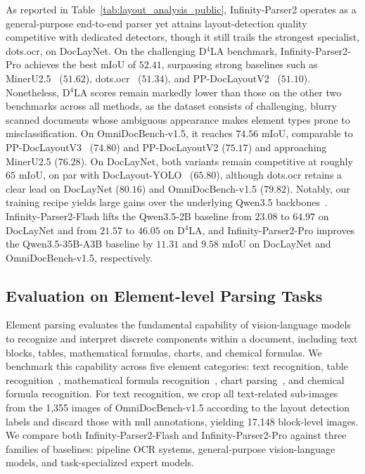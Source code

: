 As reported in Table~\ref{tab:layout_analysis_public}, Infinity-Parser2 operates as a general-purpose end-to-end parser yet attains layout-detection quality competitive with dedicated detectors, though it still trails the strongest specialist, dots.ocr, on DocLayNet. On the challenging D$^4$LA benchmark, Infinity-Parser2-Pro achieves the best mIoU of $52.41$, surpassing strong baselines such as MinerU2.5~\cite{niu2025mineru2} ($51.62$), dots.ocr~\cite{dotsocr2025} ($51.34$), and PP-DocLayoutV2~\cite{paddle2025ppdoclayoutv2} ($51.10$). Nonetheless, D$^4$LA scores remain markedly lower than those on the other two benchmarks across all methods, as the dataset consists of challenging, blurry scanned documents whose ambiguous appearance makes element types prone to misclassification. On OmniDocBench-v1.5, it reaches $74.56$ mIoU, comparable to PP-DocLayoutV3~\cite{paddle2026ppdoclayoutv3} ($74.80$) and PP-DocLayoutV2 ($75.17$) and approaching MinerU2.5 ($76.28$). On DocLayNet, both variants remain competitive at roughly $65$ mIoU, on par with DocLayout-YOLO~\cite{zhao2024doclayoutyolo} ($65.80$), although dots.ocr retains a clear lead on DocLayNet ($80.16$) and OmniDocBench-v1.5 ($79.82$). Notably, our training recipe yields large gains over the underlying Qwen3.5 backbones~\cite{qwen3.5}. Infinity-Parser2-Flash lifts the Qwen3.5-2B baseline from $23.08$ to $64.97$ on DocLayNet and from $21.57$ to $46.05$ on D$^4$LA, and Infinity-Parser2-Pro improves the Qwen3.5-35B-A3B baseline by $11.31$ and $9.58$ mIoU on DocLayNet and OmniDocBench-v1.5, respectively.

\subsection{Evaluation on Element-level Parsing Tasks}

Element parsing evaluates the fundamental capability of vision-language models to recognize and interpret discrete components within a document, including text blocks, tables, mathematical formulas, charts, and chemical formulas. We benchmark this capability across five element categories: text recognition, table recognition~\cite{zhong2020image, zheng2021global}, mathematical formula recognition~\cite{wang2024unimernet}, chart parsing~\cite{kantharaj2022chart, masry2022chartqa, chen2024onechart}, and chemical formula recognition. For text recognition, we crop all text-related sub-images from the 1,355 images of OmniDocBench-v1.5 according to the layout detection labels and discard those with null annotations, yielding 17,148 block-level images. We compare both Infinity-Parser2-Flash and Infinity-Parser2-Pro against three families of baselines: pipeline OCR systems, general-purpose vision-language models, and task-specialized expert models.

